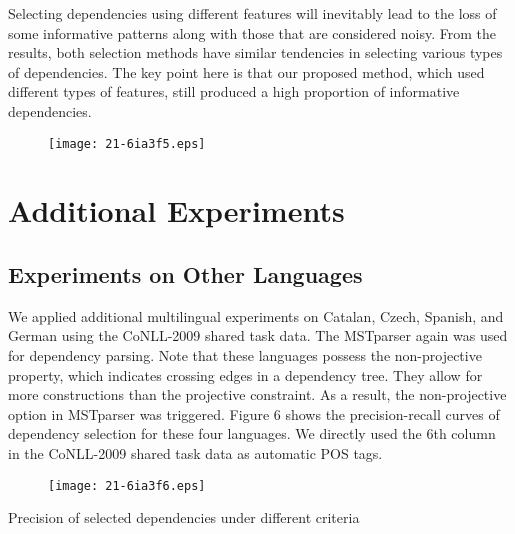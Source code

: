 \documentclass[english]{jnlp_1.4}
\begin{document}
Selecting dependencies using different features will inevitably lead to the loss of 
some informative patterns along with those that are considered noisy.
From the results, both selection methods have similar tendencies in selecting various types of dependencies.
The key point here is that our proposed method, which used different types of features, still produced a high proportion of informative dependencies.

\begin{figure}[t]
\begin{center}
\texttt{[image: 21-6ia3f5.eps]}
\end{center}
\end{figure}


\section{Additional Experiments}\label{additional}

\subsection{Experiments on Other Languages}

We applied additional multilingual experiments on Catalan, Czech, Spanish,
and German using the CoNLL-2009 shared task data. The MSTparser again was used for dependency parsing. Note that
these languages possess the non-projective property, which indicates crossing edges in a dependency tree.
They allow for more constructions than the projective constraint.
As a result, the non-projective option in
MSTparser was triggered. Figure 6 shows the precision-recall curves of dependency selection for these four languages.
We directly used the 6th column in the CoNLL-2009 shared task data as automatic POS tags.

\begin{figure}[b]
\begin{center}
\texttt{[image: 21-6ia3f6.eps]}
\end{center}
\end{figure}
\begin{table}[b]
\caption{Precision of selected dependencies under different criteria}

\end{table}
\end{document}
